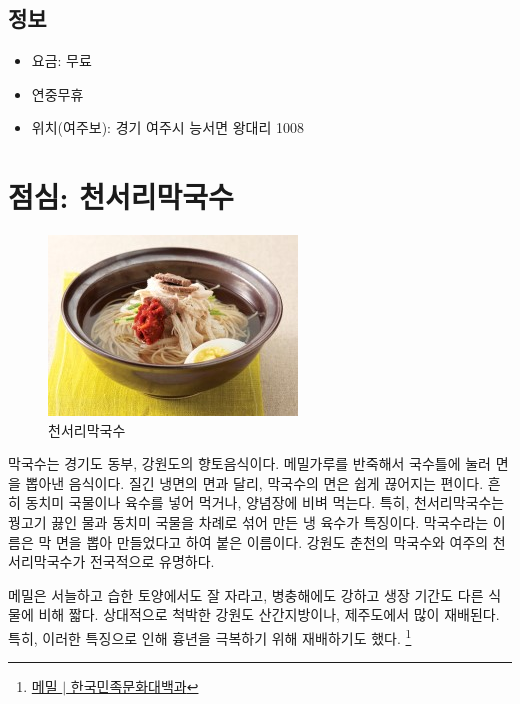 \subsection{정보}
\begin{itemize}
    \item 요금: 무료
    \item 연중무휴
    \item 위치(여주보): 경기 여주시 능서면 왕대리 1008 
\end{itemize}

\section{점심: 천서리막국수}


\begin{figure}[ht]
    \centering
    \includegraphics[width=.6\textwidth]{img/막국수.jpg}
    \caption{천서리막국수\protect\footnotemark}
    \label{fig:my_labe71}
\end{figure}
\footnotetext{\href{https://terms.naver.com/entry.naver?docId=1627391&cid=48179&categoryId=48238}{[천서리막국수 $|$ 전통향토음식 용어사전}}




막국수는 경기도 동부, 강원도의 향토음식이다. 메밀가루를 반죽해서 국수틀에 눌러 면을 뽑아낸 음식이다.
질긴 냉면의 면과 달리, 막국수의 면은 쉽게 끊어지는 편이다.
흔히 동치미 국물이나 육수를 넣어 먹거나, 양념장에 비벼 먹는다.
특히, 천서리막국수는 꿩고기 끓인 물과 동치미 국물을 차례로 섞어 만든 냉 육수가 특징이다.
막국수라는 이름은 막 면을 뽑아 만들었다고 하여 붙은 이름이다.
강원도 춘천의 막국수와 여주의 천서리막국수가 전국적으로 유명하다.


메밀은 서늘하고 습한 토양에서도 잘 자라고, 병충해에도 강하고 생장 기간도 다른 식물에 비해 짧다.
상대적으로 척박한 강원도 산간지방이나, 제주도에서 많이 재배된다. 특히, 이러한 특징으로 인해
흉년을 극복하기 위해 재배하기도 했다.
\footnote{\href{https://terms.naver.com/entry.naver?docId=545707&cid=46640&categoryId=46640}{메밀 $|$ 한국민족문화대백과}}


